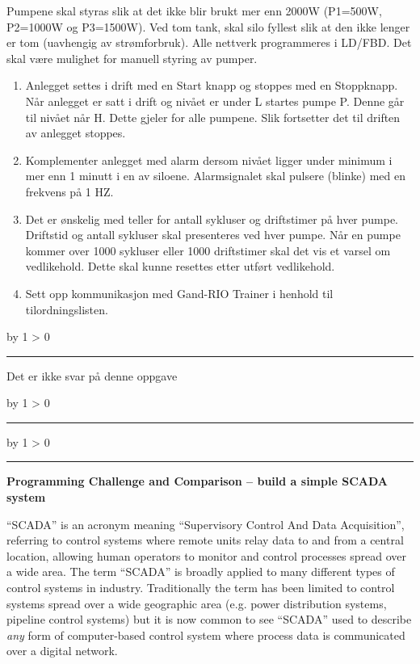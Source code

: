 \documentclass[12pt,a4paper]{article}
\def\oppgave{
            \advance\questnum by 1
            \ifnum \questnum > 0
                 \hrule
                 \vskip 3pt
                 \leftline{Oppgave \the\questnum}
                 \vskip 3pt \fi}
\def\svar{
           \advance\answnum by 1
           \ifnum \answnum > 0
                \hrule
                \vskip 3pt
                \leftline{Svar \the\answnum}
                \vskip 3pt \fi}
\def\notes{
           \advance\explnum by 1
           \ifnum \explnum > 0
                \hrule
                \vskip 3pt
                \leftline{Notes \the\explnum}
                \vskip 3pt \fi}
\begin{document}
Pumpene skal styras slik at det ikke blir brukt mer enn 2000W (P1=500W,
P2=1000W og P3=1500W). Ved tom tank, skal silo fyllest slik at den
ikke lenger er tom (uavhengig av strømforbruk). Alle nettverk programmeres
i LD/FBD. Det skal være mulighet for manuell styring av pumper. 
\begin{enumerate}
\item Anlegget settes i drift med en Start knapp og stoppes med en Stoppknapp.
Når anlegget er satt i drift og nivået er under L startes pumpe P.
Denne går til nivået når H. Dette gjeler for alle pumpene. Slik fortsetter
det til driften av anlegget stoppes. 
\item Komplementer anlegget med alarm dersom nivået ligger under minimum
i mer enn 1 minutt i en av siloene. Alarmsignalet skal pulsere (blinke)
med en frekvens på 1 HZ. 
\item Det er ønskelig med teller for antall sykluser og driftstimer på hver
pumpe. Driftstid og antall sykluser skal presenteres ved hver pumpe.
Når en pumpe kommer over 1000 sykluser eller 1000 driftstimer skal
det vis et varsel om vedlikehold. Dette skal kunne resettes etter
utført vedlikehold. 
\item Sett opp kommunikasjon med Gand-RIO Trainer i henhold til tilordningslisten.
\end{enumerate}
\vskip 10pt
\vskip 10pt \filbreak 





\svar{} 
Det er ikke svar på denne oppgave
\vskip 10pt \filbreak 





\notes{} 



\vfil \eject 





\oppgave{} 

\noindent
{\bf Programming Challenge and Comparison -- build a simple SCADA system} 

\vskip 10pt

``SCADA'' is an acronym meaning ``Supervisory Control And Data Acquisition'', referring to control systems where remote units relay data to and from a central location, allowing human operators to monitor and control processes spread over a wide area.  The term ``SCADA'' is broadly applied to many different types of control systems in industry.  Traditionally the term has been limited to control systems spread over a wide geographic area (e.g. power distribution systems, pipeline control systems) but it is now common to see ``SCADA'' used to describe {\it any} form of computer-based control system where process data is communicated over a digital network.  
\end{document}

